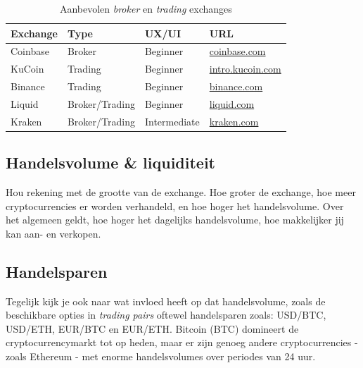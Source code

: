 \begin{table}[b]

\centering

\caption{Aanbevolen \emph{broker} en \emph{trading} exchanges}
\begin{tabular}{llll} 
\toprule

\textbf{Exchange} & \textbf{Type } & \textbf{UX/UI} & \textbf{URL}\\
\midrule

Coinbase & Broker & Beginner & \href{https://www.coinbase.com/join/51954a2b26a1bcc484000015}{coinbase.com} \\
KuCoin   &  Trading & Beginner & \href{https://www.kucoin.com/#/?r=aNuPeb}{intro.kucoin.com} \\
Binance  &  Trading & Beginner & \href{https://www.binance.com/?ref=35602166}{binance.com} \\
Liquid   &  Broker/Trading & Beginner & \href{https://www.liquid.com?affiliate=nUfQhVL4164547}{liquid.com} \\
Kraken   &  Broker/Trading & Intermediate & \href{https://www.kraken.com/}{kraken.com} \\


\bottomrule
\end{tabular}
\label{tab:exchange selection}
\end{table}

\subsection*{Handelsvolume \& liquiditeit}
Hou rekening met de grootte van de exchange. Hoe groter de exchange, hoe meer cryptocurrencies er worden verhandeld, en hoe hoger het handelsvolume. Over het algemeen geldt, hoe hoger het dagelijks handelsvolume, hoe makkelijker jij kan aan- en verkopen.

\subsection*{Handelsparen}
Tegelijk kijk je ook naar wat invloed heeft op dat handelsvolume, zoals de beschikbare opties in \emph{trading pairs} oftewel handelsparen zoals: USD/BTC, USD/ETH, EUR/BTC en EUR/ETH. Bitcoin (BTC) domineert de cryptocurrencymarkt tot op heden, maar er zijn genoeg andere cryptocurrencies - zoals Ethereum - met enorme handelsvolumes over periodes van 24 uur.


